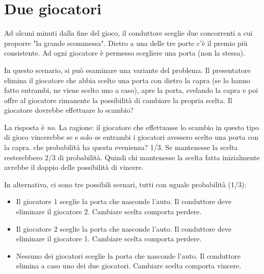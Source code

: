 \documentclass[a4paper, 12pt]{report}
\begin{document}
\section{Due giocatori}
Ad alcuni minuti dalla fine del gioco, il conduttore sceglie due concorrenti a cui proporre "la grande scommessa". Dietro a una delle tre porte c'è il premio più consistente. Ad ogni giocatore è permesso scegliere una porta (non la stessa).

In questo scenario, si può esaminare una variante del problema. Il presentatore elimina il giocatore che abbia scelto una porta con dietro la capra (se lo hanno fatto entrambi, ne viene scelto uno a caso), apre la porta, svelando la capra e poi offre al giocatore rimanente la possibilità di cambiare la propria scelta. Il giocatore dovrebbe effettuare lo scambio?

La risposta è \textit{no}. La ragione: il giocatore che effettuasse lo scambio in questo tipo di gioco vincerebbe se e solo se entrambi i giocatori avessero scelto una porta con la capra. che probabilità ha questa evenienza? 1/3. Se mantenesse la scelta resterebbero 2/3 di probabilità. Quindi chi mantenesse la scelta fatta inizialmente avrebbe il doppio delle possibilità di vincere.

In alternativa, ci sono tre possibili scenari, tutti con uguale probabilità (1/3):

\begin{itemize}
	\item Il giocatore 1 sceglie la porta che nasconde l'auto. Il conduttore deve eliminare il giocatore 2. Cambiare scelta comporta perdere.
	\item Il giocatore 2 sceglie la porta che nasconde l'auto. Il conduttore deve eliminare il giocatore 1. Cambiare scelta comporta perdere.
	\item Nessuno dei giocatori sceglie la porta che nasconde l'auto. Il conduttore elimina a caso uno dei due giocatori. Cambiare scelta comporta vincere.
\end{itemize}
\end{document}

